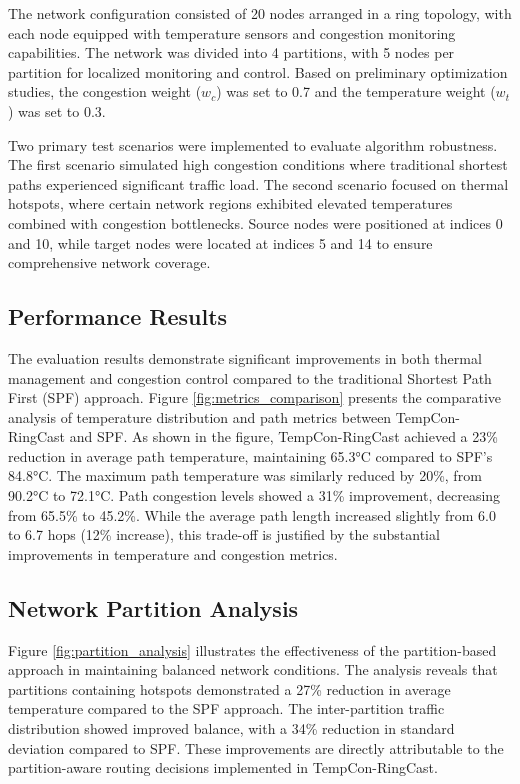 \documentclass[conference]{IEEEtran}
\begin{document}
The network configuration consisted of 20 nodes arranged in a ring topology, with each node equipped with temperature sensors and congestion monitoring capabilities. The network was divided into 4 partitions, with 5 nodes per partition for localized monitoring and control. Based on preliminary optimization studies, the congestion weight ($w_c$) was set to 0.7 and the temperature weight ($w_t$) was set to 0.3.

Two primary test scenarios were implemented to evaluate algorithm robustness. The first scenario simulated high congestion conditions where traditional shortest paths experienced significant traffic load. The second scenario focused on thermal hotspots, where certain network regions exhibited elevated temperatures combined with congestion bottlenecks. Source nodes were positioned at indices 0 and 10, while target nodes were located at indices 5 and 14 to ensure comprehensive network coverage.

\subsection{Performance Results}
The evaluation results demonstrate significant improvements in both thermal management and congestion control compared to the traditional Shortest Path First (SPF) approach. Figure \ref{fig:metrics_comparison} presents the comparative analysis of temperature distribution and path metrics between TempCon-RingCast and SPF. As shown in the figure, TempCon-RingCast achieved a 23\% reduction in average path temperature, maintaining 65.3°C compared to SPF's 84.8°C. The maximum path temperature was similarly reduced by 20\%, from 90.2°C to 72.1°C. Path congestion levels showed a 31\% improvement, decreasing from 65.5\% to 45.2\%. While the average path length increased slightly from 6.0 to 6.7 hops (12\% increase), this trade-off is justified by the substantial improvements in temperature and congestion metrics.

\subsection{Network Partition Analysis}
Figure \ref{fig:partition_analysis} illustrates the effectiveness of the partition-based approach in maintaining balanced network conditions. The analysis reveals that partitions containing hotspots demonstrated a 27\% reduction in average temperature compared to the SPF approach. The inter-partition traffic distribution showed improved balance, with a 34\% reduction in standard deviation compared to SPF. These improvements are directly attributable to the partition-aware routing decisions implemented in TempCon-RingCast.
\end{document}
